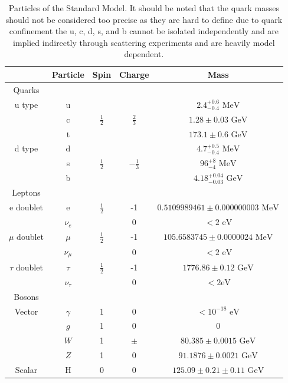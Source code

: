 \begin{table}[h]
\begin{center}
\footnotesize
\begin{tabular}[h]{|c||c|c|c|c|}
\hline
 & Particle & Spin & Charge & Mass \\
\hline\hline
Quarks &&&&\\
\hline
u type &u& & &${2.4^{+0.6}_{-0.4} \text{ MeV}}$\\
 &c&${\frac{1}{2}}$&${\frac{2}{3}}$&${1.28\pm{0.03} \text{ GeV}}$\\
 &t& & &${173.1\pm{0.6} \text{ GeV}}$\\
\hline
d type & d& & & ${4.7^{+0.5}_{-0.4} \text{ MeV}}$\\
 & s & ${\frac{1}{2}}$ & ${-\frac{1}{3}}$ & ${96^{+8}_{-4} \text{ MeV}}$\\
 & b & & & ${4.18^{+0.04}_{-0.03} \text{ GeV}}$\\
\hline\hline
Leptons &&&&\\
\hline
e doublet & e & ${\frac{1}{2}}$ & -1 &${0.5109989461\pm{}0.000000003 \text{ MeV}}$\\
 & ${\nu_{e}}$ & & 0 & ${< 2 \text{ eV}}$\\
 \hline
${\mu}$ doublet & ${\mu}$ & ${\frac{1}{2}}$ & -1 &${105.6583745\pm{}0.0000024 \text{ MeV}}$\\
 & ${\nu_{\mu}}$ & & 0 & ${< 2 \text{ eV}}$\\
 \hline
${\tau}$ doublet & ${\tau}$ & ${\frac{1}{2}}$ & -1 &${1776.86\pm{}0.12 \text{ GeV}}$\\
 & ${\nu_{\tau}}$ & & 0 & ${< 2 \text{eV}}$\\
 \hline\hline
 Bosons &&&&\\
 \hline
 Vector & ${\gamma}$ & 1 & 0 & ${< 10^{-18} \text{ eV}}$\\
 & ${g}$ & 1 & 0 & ${0}$\\
 & ${W}$ & 1 & ${\pm}$ & ${80.385\pm{}0.0015 \text{ GeV}}$\\
 & ${Z}$ & 1 & 0 & ${91.1876\pm{}0.0021 \text{ GeV}}$\\
 \hline
 Scalar & H & 0& 0 & ${125.09\pm{}0.21\pm{}0.11 \text{ GeV}}$\\
 \hline
\end{tabular}
\caption[Particles of the Standard Model.]{Particles of the Standard Model\cite{PDG2018}. It should be noted that the quark masses should not be considered too precise as they are hard to define due to quark confinement\cite{QuarkConfinement} the u, c, d, s, and b cannot be isolated independently and are implied indirectly through scattering experiments and are heavily model dependent.}
\label{tab:SM}
\end{center}
\end{table}


